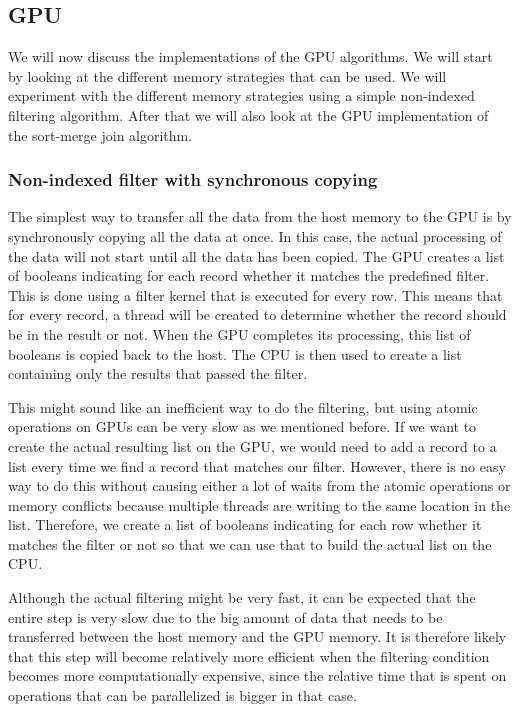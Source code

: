 \documentclass[a4paper,titlepage]{article}
\begin{document}
\subsection{GPU}
\label{sec:gpu-implementation}
We will now discuss the implementations of the GPU algorithms. We will start by looking at the different memory strategies that can be used. We will experiment with the different memory strategies using a simple non-indexed filtering algorithm. After that we will also look at the GPU implementation of the sort-merge join algorithm.

\subsubsection{Non-indexed filter with synchronous copying}
\label{sec:filter-synchronous}
The simplest way to transfer all the data from the host memory to the GPU is by synchronously copying all the data at once. In this case, the actual processing of the data will not start until all the data has been copied. The GPU creates a list of booleans indicating for each record whether it matches the predefined filter. This is done using a filter kernel that is executed for every row. This means that for every record, a thread will be created to determine whether the record should be in the result or not. When the GPU completes its processing, this list of booleans is copied back to the host. The CPU is then used to create a list containing only the results that passed the filter.

This might sound like an inefficient way to do the filtering, but using atomic operations on GPUs can be very slow as we mentioned before. If we want to create the actual resulting list on the GPU, we would need to add a record to a list every time we find a record that matches our filter. However, there is no easy way to do this without causing either a lot of waits from the atomic operations or memory conflicts because multiple threads are writing to the same location in the list. Therefore, we create a list of booleans indicating for each row whether it matches the filter or not so that we can use that to build the actual list on the CPU.

Although the actual filtering might be very fast, it can be expected that the entire step is very slow due to the big amount of data that needs to be transferred between the host memory and the GPU memory. It is therefore likely that this step will become relatively more efficient when the filtering condition becomes more computationally expensive, since the relative time that is spent on operations that can be parallelized is bigger in that case.
\end{document}
